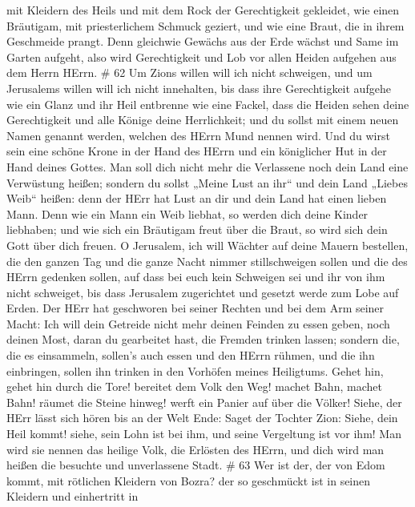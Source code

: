 mit Kleidern des Heils und mit dem Rock der Gerechtigkeit gekleidet, wie
einen Bräutigam, mit priesterlichem Schmuck geziert, und wie eine Braut,
die in ihrem Geschmeide prangt.  Denn gleichwie Gewächs aus
der Erde wächst und Same im Garten aufgeht, also wird Gerechtigkeit und
Lob vor allen Heiden aufgehen aus dem Herrn HErrn. \# 62  Um
Zions willen will ich nicht schweigen, und um Jerusalems willen will ich
nicht innehalten, bis dass ihre Gerechtigkeit aufgehe wie ein Glanz und
ihr Heil entbrenne wie eine Fackel,  dass die Heiden sehen
deine Gerechtigkeit und alle Könige deine Herrlichkeit; und du sollst
mit einem neuen Namen genannt werden, welchen des HErrn Mund nennen
wird.  Und du wirst sein eine schöne Krone in der Hand des
HErrn und ein königlicher Hut in der Hand deines Gottes. 
Man soll dich nicht mehr die Verlassene noch dein Land eine Verwüstung
heißen; sondern du sollst „Meine Lust an ihr`` und dein Land „Liebes
Weib`` heißen: denn der HErr hat Lust an dir und dein Land hat einen
lieben Mann.  Denn wie ein Mann ein Weib liebhat, so werden
dich deine Kinder liebhaben; und wie sich ein Bräutigam freut über die
Braut, so wird sich dein Gott über dich freuen.  O
Jerusalem, ich will Wächter auf deine Mauern bestellen, die den ganzen
Tag und die ganze Nacht nimmer stillschweigen sollen und die des HErrn
gedenken sollen, auf dass bei euch kein Schweigen sei  und
ihr von ihm nicht schweiget, bis dass Jerusalem zugerichtet und gesetzt
werde zum Lobe auf Erden.  Der HErr hat geschworen bei
seiner Rechten und bei dem Arm seiner Macht: Ich will dein Getreide
nicht mehr deinen Feinden zu essen geben, noch deinen Most, daran du
gearbeitet hast, die Fremden trinken lassen;  sondern die,
die es einsammeln, sollen's auch essen und den HErrn rühmen, und die ihn
einbringen, sollen ihn trinken in den Vorhöfen meines Heiligtums.
 Gehet hin, gehet hin durch die Tore! bereitet dem Volk den
Weg! machet Bahn, machet Bahn! räumet die Steine hinweg! werft ein
Panier auf über die Völker!  Siehe, der HErr lässt sich
hören bis an der Welt Ende: Saget der Tochter Zion: Siehe, dein Heil
kommt! siehe, sein Lohn ist bei ihm, und seine Vergeltung ist vor ihm!
 Man wird sie nennen das heilige Volk, die Erlösten des
HErrn, und dich wird man heißen die besuchte und unverlassene Stadt. \#
63  Wer ist der, der von Edom kommt, mit rötlichen Kleidern
von Bozra? der so geschmückt ist in seinen Kleidern und einhertritt in
